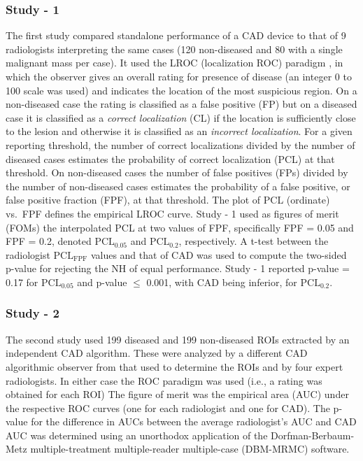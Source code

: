 \documentclass[
]{book}
\begin{document}
\hypertarget{standalone-cad-radiologists-study1}{%
\subsubsection{Study - 1}\label{standalone-cad-radiologists-study1}}

The first study \citep{hupse2013standalone} compared standalone performance of a CAD device to that of 9 radiologists interpreting the same cases (120 non-diseased and 80 with a single malignant mass per case). It used the LROC (localization ROC) paradigm \citep{starr1975visual, metz1976observer, swensson1996unified}, in which the observer gives an overall rating for presence of disease (an integer 0 to 100 scale was used) and indicates the location of the most suspicious region. On a non-diseased case the rating is classified as a false positive (FP) but on a diseased case it is classified as a \emph{correct localization} (CL) if the location is sufficiently close to the lesion and otherwise it is classified as an \emph{incorrect localization}. For a given reporting threshold, the number of correct localizations divided by the number of diseased cases estimates the probability of correct localization (PCL) at that threshold. On non-diseased cases the number of false positives (FPs) divided by the number of non-diseased cases estimates the probability of a false positive, or false positive fraction (FPF), at that threshold. The plot of PCL (ordinate) vs.~FPF defines the empirical LROC curve. Study - 1 used as figures of merit (FOMs) the interpolated PCL at two values of FPF, specifically FPF = 0.05 and FPF = 0.2, denoted \(\text{PCL}_{0.05}\) and \(\text{PCL}_{0.2}\), respectively. A t-test between the radiologist \(\text{PCL}_{\text{FPF}}\) values and that of CAD was used to compute the two-sided p-value for rejecting the NH of equal performance. Study - 1 reported p-value = 0.17 for \(\text{PCL}_{0.05}\) and p-value \(\leq\) 0.001, with CAD being inferior, for \(\text{PCL}_{0.2}\).

\hypertarget{standalone-cad-radiologists-study2}{%
\subsubsection{Study - 2}\label{standalone-cad-radiologists-study2}}

The second study \citep{kooi2016comparison} used 199 diseased and 199 non-diseased ROIs extracted by an independent CAD algorithm. These were analyzed by a different CAD algorithmic observer from that used to determine the ROIs and by four expert radiologists. In either case the ROC paradigm was used (i.e., a rating was obtained for each ROI) The figure of merit was the empirical area (AUC) under the respective ROC curves (one for each radiologist and one for CAD). The p-value for the difference in AUCs between the average radiologist's AUC and CAD AUC was determined using an unorthodox application of the Dorfman-Berbaum-Metz \citep{dorfman1992receiver} multiple-treatment multiple-reader multiple-case (DBM-MRMC) software.
\end{document}
